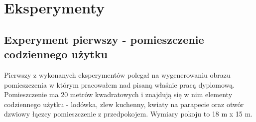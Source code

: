 \section {Eksperymenty}
\subsection {Experyment pierwszy - pomieszczenie codziennego użytku}
Pierwszy z wykonanych eksperymentów polegał na wygenerowaniu obrazu pomieszczenia w którym pracowałem nad pisaną właśnie pracą dyplomową.
Pomieszczenie ma 20 metrów kwadratowych i znajdują się w nim elementy codziennego użytku - lodówka, zlew kuchenny, kwiaty na parapecie oraz otwór dzwiowy łączcy pomieszczenie z przedpokojem. Wymiary pokoju to 18 m x 15 m.
